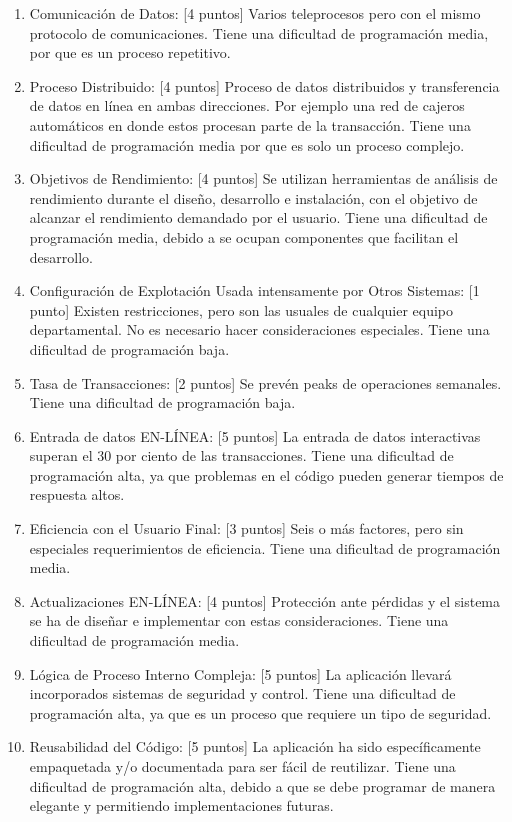 \documentclass[a4paper,12pt,openany,oneside]{book}
\begin{document}
\begin{enumerate}
	\item Comunicación de Datos: [4 puntos] Varios teleprocesos pero con el mismo protocolo de comunicaciones. Tiene una dificultad de programación media, por que es un proceso repetitivo.
	\item Proceso Distribuido: [4 puntos] Proceso de datos distribuidos y transferencia de datos en línea en ambas direcciones. Por ejemplo una red de cajeros automáticos en donde estos procesan parte de la transacción. Tiene una dificultad de programación media por que es solo un proceso complejo.
	\item Objetivos de Rendimiento: [4 puntos] Se utilizan herramientas de análisis de rendimiento durante el diseño, desarrollo e instalación, con el objetivo de alcanzar el rendimiento demandado por el usuario. Tiene una dificultad de programación media, debido a se ocupan componentes que facilitan el desarrollo.
	\item Configuración de Explotación Usada intensamente por Otros Sistemas: [1 punto] Existen restricciones, pero son las usuales de cualquier equipo departamental. No es necesario hacer consideraciones especiales. Tiene una dificultad de programación baja. 
	\item Tasa de Transacciones: [2 puntos] Se prevén peaks de operaciones semanales. Tiene una dificultad de programación baja.
	\item Entrada de datos EN-LÍNEA: [5 puntos] La entrada de datos interactivas superan el 30 por ciento de las transacciones. Tiene una dificultad de programación alta, ya que problemas en el código pueden generar tiempos de respuesta altos.
	\item Eficiencia con el Usuario Final: [3 puntos] Seis o más factores, pero sin especiales requerimientos de eficiencia. Tiene una dificultad de programación media.
	\item Actualizaciones EN-LÍNEA: [4 puntos] Protección ante pérdidas y el sistema se ha de diseñar e implementar con estas consideraciones. Tiene una dificultad de programación media.
	\item Lógica de Proceso Interno Compleja: [5 puntos] La aplicación llevará incorporados sistemas de seguridad y control. Tiene una dificultad de programación alta, ya que es un proceso que requiere un tipo de seguridad.
	\item Reusabilidad del Código: [5 puntos] La aplicación ha sido específicamente empaquetada y/o documentada para ser fácil de reutilizar. Tiene una dificultad de programación alta, debido a que se debe programar de manera elegante y permitiendo implementaciones futuras.

\end{enumerate}
\end{document}
